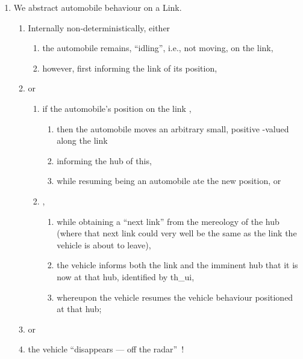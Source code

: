 {
\bmcii%
\begin{enumerate}\setei
\item \label{p-abff0} We abstract automobile
                    behaviour \textsf{on} a \textsf{Link}. 
\begin{enumerate}
\item \label{p-abff1} Internally non-deterministically,  either 
\begin{enumerate}
\item \label{p-abff3} the automobile remains, ``idling'', i.e., not moving,
                    on the link,
\item \label{p-abff2} however, first informing the link of its position,
\end{enumerate}
\item \label{p-abff4} or
\begin{enumerate}
\item \label{p-abff5}  if the automobile's position on the link
                    ,  
\begin{enumerate}
\item \label{p-abff7} then the automobile moves an arbitrary
                    small, positive -valued 
                    along the link 
\item \label{p-abff8} informing the hub of this, 
\item \label{p-abff9} while resuming being an automobile ate the new
                    position, or 
\end{enumerate}
\pos{\psno}{\mnewfoil}
\item \label{p-abffa} ,
\begin{enumerate}
\item \label{p-abffb} while obtaining a ``next link'' from the
                    mereology of the hub (where that next link could
                    very well be the same as the link the vehicle is
                    about to leave),
\item \label{p-abffc} the vehicle informs both the link and the imminent hub
                    that it is now at that
                    hub, identified by \textsf{th\_ui},
\item \label{p-abffd} whereupon the vehicle resumes the vehicle
                    behaviour positioned at that hub;
\end{enumerate} 
\end{enumerate} 
\item \label{p-abffe} or
\item \label{p-abfff} the vehicle ``disappears --- off the radar''~!
\end{enumerate} 
\savei\end{enumerate}

}

